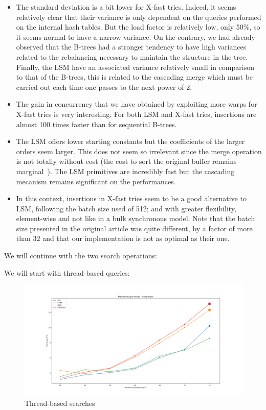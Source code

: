 \begin{itemize}
    \item The standard deviation is a bit lower for X-fast tries. Indeed, it seems relatively clear that their variance is only dependent on the queries performed on the internal hash tables. But the load factor is relatively low, only 50\%, so it seems normal to have a narrow variance. On the contrary, we had already observed that the B-trees had a stronger tendency to have high variances related to the rebalancing necessary to maintain the structure in the tree. Finally, the LSM have an associated variance relatively small in comparison to that of the B-trees, this is related to the cascading merge which must be carried out each time one passes to the next power of 2.
    \item The gain in concurrency that we have obtained by exploiting more warps for X-fast tries is very interesting. For both LSM and X-fast tries, insertions are almost 100 times faster than for sequential B-trees.
    \item The LSM offers lower starting constants but the coefficients of the larger orders seem larger. This does not seem so irrelevant since the merge operation is not totally without cost (the cost to sort the original buffer remains marginal~\cite{ashkiani2017parallel}). The LSM primitives are incredibly fast but the cascading mecanism remains significant on the performances.
    \item In this context, insertions in X-fast tries seem to be a good alternative to LSM, following the batch size used of 512; and with greater flexibility, element-wise and not like in a bulk synchronous model. Note that the batch size presented in the original article was quite different, by a factor of more than 32 and that our implementation is not as optimal as their one.
\end{itemize}

We will continue with the two search operations:

We will start with thread-based queries:

\begin{figure}[!htb]
    \centering
    \includegraphics[width=0.85\linewidth]{Chapters/ParallelXFastTries/Membership_thread.png} 
    \caption{Thread-based searches}
\end{figure}

